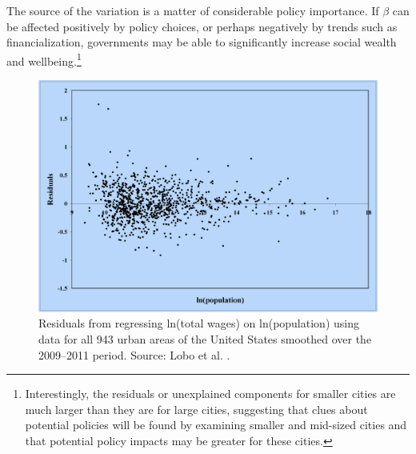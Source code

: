 



The source of the variation is a matter of considerable policy importance. If $\beta$ can be affected positively by policy choices, or perhaps negatively by trends such as financialization, governments may be able to significantly increase social wealth and wellbeing.\footnote{Interestingly, the residuals or unexplained components for smaller cities are much larger than they are for large cities, suggesting that clues about potential policies will be found by examining smaller and mid-sized cities and that potential policy impacts may be greater for these cities.}

\begin{figure}
    \centering
    \includegraphics[scale=0.40]{fig/residuals-lobo.png}
    \caption{Residuals from regressing ln(total wages) on ln(population) using data for all 943 urban areas of the United States smoothed over the 2009--2011 period. Source: Lobo et al. \cite{loboUrbanScalingProduction2013}.}
    \label{fig-residuals-lobo}
\end{figure}


